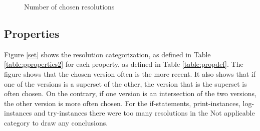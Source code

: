 \begin{figure}
\caption{Number of chosen resolutions}\label{fig:groups}
\end{figure}
\FloatBarrier


\subsection{Properties}
Figure \ref{set} shows the resolution categorization, as defined in Table \ref{table:pproperties2} for each property, as defined in Table \ref{table:propdef}. The figure shows that the chosen version often is the more recent. It also shows that if one of the versions is a superset of the other, the version that is the superset is often chosen. On the contrary, if one version is an intersection of the two versions, the other version is more often chosen. For the if-statements, print-instances, log-instances and try-instances there were too many resolutions in the Not applicable category to draw any conclusions.


